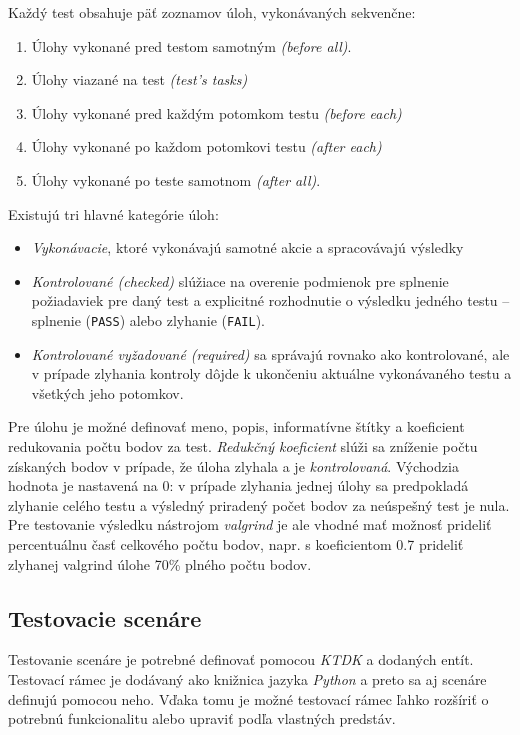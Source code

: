 \documentclass[
  digital, %
  oneside, %
  table,   %
  lof,     %
  lot,   %
]{fithesis3}
\begin{document}
Každý test obsahuje päť zoznamov úloh, vykonávaných sekvenčne:
\begin{enumerate}
    \item Úlohy vykonané pred testom samotným \emph{(before all)}.
    \item Úlohy viazané na test \emph{(test's tasks)}
    \item Úlohy vykonané pred každým potomkom testu \emph{(before each)} 
    \item Úlohy vykonané po každom potomkovi testu \emph{(after each)}
    \item Úlohy vykonané po teste samotnom \emph{(after all)}.
\end{enumerate}

Existujú tri hlavné kategórie úloh:
\begin{itemize}
    \item \emph{Vykonávacie}, ktoré vykonávajú samotné akcie a spracovávajú výsledky
    \item \emph{Kontrolované (checked)} slúžiace na overenie podmienok pre splnenie požiadaviek pre daný test a explicitné rozhodnutie o výsledku jedného testu -- splnenie (\texttt{PASS}) alebo zlyhanie (\texttt{FAIL}).
    \item \emph{Kontrolované vyžadované (required)} sa správajú rovnako ako kontrolované, ale v prípade zlyhania kontroly dôjde k ukončeniu aktuálne vykonávaného testu a všetkých jeho potomkov.
\end{itemize}

Pre úlohu je možné definovať meno, popis, informatívne štítky a koeficient redukovania počtu bodov za test. \emph{Redukčný koeficient} slúži sa zníženie počtu získaných bodov v prípade, že úloha zlyhala a je \emph{kontrolovaná}. Východzia hodnota je nastavená na 0: v prípade zlyhania jednej úlohy sa predpokladá zlyhanie celého testu a výsledný priradený počet bodov za neúspešný test je nula. Pre testovanie výsledku nástrojom \emph{valgrind} je ale vhodné mať možnosť prideliť percentuálnu časť celkového počtu bodov, napr. s koeficientom 0.7 prideliť zlyhanej valgrind úlohe 70\% plného počtu bodov.

\subsection{Testovacie scenáre}

Testovanie scenáre je potrebné definovať pomocou \emph{KTDK} a dodaných entít. Testovací rámec je dodávaný ako knižnica jazyka \emph{Python} a preto sa aj scenáre definujú pomocou neho. Vďaka tomu je možné testovací rámec ľahko rozšíriť o potrebnú funkcionalitu alebo upraviť podľa vlastných predstáv. 
\end{document}
